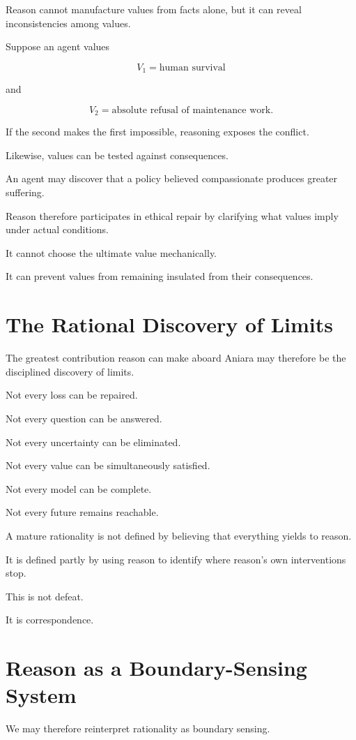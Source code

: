 \documentclass[11pt,oneside]{book}
\theoremstyle{definition}
\theoremstyle{remark}
\begin{document}
Reason cannot manufacture values from facts alone, but it can reveal inconsistencies among values.

Suppose an agent values

\[
V_1=\text{human survival}
\]

and

\[
V_2=\text{absolute refusal of maintenance work}.
\]

If the second makes the first impossible, reasoning exposes the conflict.

Likewise, values can be tested against consequences.

An agent may discover that a policy believed compassionate produces greater suffering.

Reason therefore participates in ethical repair by clarifying what values imply under actual conditions.

It cannot choose the ultimate value mechanically.

It can prevent values from remaining insulated from their consequences.

\section{The Rational Discovery of Limits}

The greatest contribution reason can make aboard Aniara may therefore be the disciplined discovery of limits.

Not every loss can be repaired.

Not every question can be answered.

Not every uncertainty can be eliminated.

Not every value can be simultaneously satisfied.

Not every model can be complete.

Not every future remains reachable.

A mature rationality is not defined by believing that everything yields to reason.

It is defined partly by using reason to identify where reason's own interventions stop.

This is not defeat.

It is correspondence.

\section{Reason as a Boundary-Sensing System}

We may therefore reinterpret rationality as boundary sensing.
\end{document}
